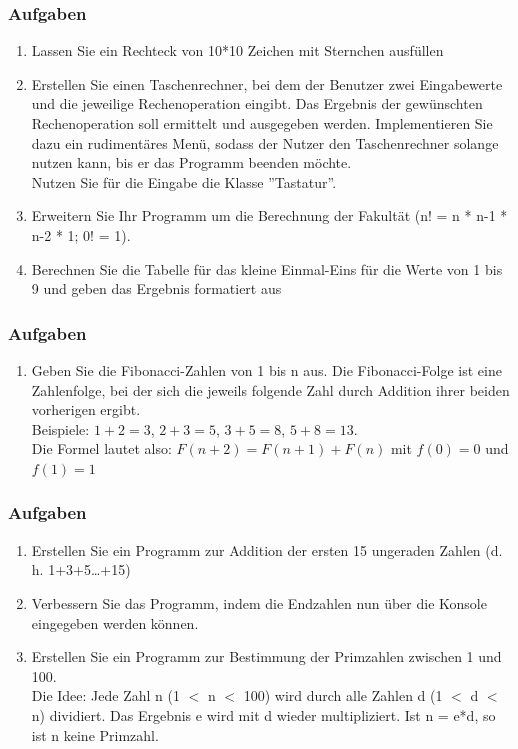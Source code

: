 \begin{frame}
	\frametitle{Aufgaben}
	\begin{enumerate}
	  \item Lassen Sie ein Rechteck von 10*10 Zeichen mit Sternchen ausfüllen
	  \item Erstellen Sie einen Taschenrechner, bei dem der Benutzer zwei
	  		Eingabewerte und die jeweilige Rechenoperation eingibt. Das Ergebnis der
	  		gewünschten Rechenoperation soll ermittelt und ausgegeben werden.
	  		Implementieren Sie dazu ein rudimentäres Menü, sodass der Nutzer den
	  		Taschenrechner solange nutzen kann, bis er das Programm beenden möchte.
	  		\\Nutzen Sie für die Eingabe die Klasse ''Tastatur''.
	  \item Erweitern Sie Ihr Programm um die Berechnung der Fakultät (n! = n * n-1
	  		* n-2 * 1; 0! = 1).
	  \item Berechnen Sie die Tabelle für das kleine Einmal-Eins für die Werte von
	  		1 bis 9 und geben das Ergebnis formatiert aus
	\end{enumerate}
\end{frame}

\begin{frame}
	\frametitle{Aufgaben}
	\begin{enumerate}
	  \item Geben Sie die Fibonacci-Zahlen von 1 bis n aus. Die Fibonacci-Folge ist
	 		eine Zahlenfolge, bei der sich die jeweils folgende Zahl durch Addition
	  		ihrer beiden vorherigen ergibt.\\
	  		Beispiele: $1+2=3$, $2+3=5$, $3+5=8$, $5+8=13$. 
	  		\\Die Formel lautet also: $F(n+2)=F(n+1) +F(n)$ mit $f(0) = 0$ und $f(1) =
	  		1$
	\end{enumerate}
\end{frame}

\begin{frame}
	\frametitle{Aufgaben}
	\begin{enumerate}
	  \item Erstellen Sie ein Programm zur Addition der ersten 15 ungeraden Zahlen
	 		(d. h. 1+3+5\ldots+15)
	  \item Verbessern Sie das Programm, indem die Endzahlen nun über die Konsole
	  		eingegeben werden können.
	  \item Erstellen Sie ein Programm zur Bestimmung der Primzahlen zwischen 1
	  		und 100.\\
	  		Die Idee: Jede Zahl n (1 $<$ n $<$ 100) wird durch alle Zahlen d (1 $<$ d
	  		$<$ n) dividiert. Das Ergebnis e wird mit d wieder multipliziert. Ist n =
	  		e*d, so ist n keine Primzahl.
	\end{enumerate}
\end{frame}

